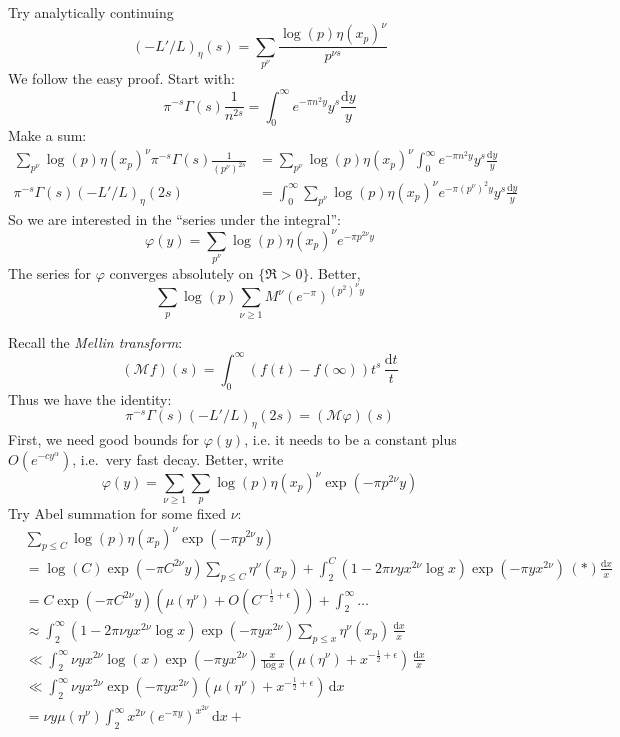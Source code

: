 \documentclass{article}
\newcommand{\cM}{\mathcal{M}}
\newcommand{\dd}{\mathrm{d}}
\theoremstyle{definition}
\begin{document}
Try analytically continuing 
\[
	(-L'/L)_\eta(s) = \sum_{p^\nu} \frac{\log(p)\eta(x_p)^\nu}{p^{\nu s}}
\]
We follow the easy proof. Start with:
\[
	\pi^{-s} \Gamma(s) \frac{1}{n^{2s}} = \int_0^\infty e^{-\pi n^2 y} y^s \frac{\dd y}{y}
\]
Make a sum:
\begin{align*}
	\sum_{p^\nu} \log(p) \eta(x_p)^\nu \pi^{-s} \Gamma(s) \frac{1}{(p^\nu)^{2s}}
		&= \sum_{p^\nu} \log(p) \eta(x_p)^\nu \int_0^\infty e^{-\pi n^2 y} y^s \frac{\dd y}{y} \\
	\pi^{-s} \Gamma(s) (-L'/L)_\eta(2s) 
		&=\int_0^\infty \sum_{p^\nu} \log(p) \eta(x_p)^\nu e^{-\pi (p^\nu)^2 y} y^s \frac{\dd y}{y}
\end{align*}
So we are interested in the ``series under the integral'':
\[
	\varphi(y) = \sum_{p^\nu} \log(p) \eta(x_p)^\nu e^{-\pi p^{2\nu} y} 
\]
The series for $\varphi$ converges absolutely on $\{\Re>0\}$. Better, 
\[
	\sum_p\log(p)\sum_{\nu\geqslant 1}  M^\nu (e^{-\pi})^{(p^2)^\nu y}
\]

Recall the \emph{Mellin transform}:
\[
	(\cM f)(s) = \int_0^\infty (f(t)-f(\infty))t^s\, \frac{\dd t}{t}
\]
Thus we have the identity:
\[
	\pi^{-s} \Gamma(s) (-L'/L)_\eta(2s) = (\cM \varphi)(s)
\]
First, we need good bounds for $\varphi(y)$, i.e. it needs to be a constant 
plus $O(e^{-c y^\alpha})$, i.e.~very fast decay. Better, write 
\[
	\varphi(y) = \sum_{\nu\geqslant 1}\sum_p  \log(p) \eta(x_p)^\nu \exp(-\pi p^{2\nu}y)
\]
Try Abel summation for some fixed $\nu$:
\begin{align*}
	& \sum_{p\leqslant C}\log(p) \eta(x_p)^\nu \exp(-\pi p^{2\nu}y) \\
		&= \log(C)\exp(-\pi C^{2\nu} y) \sum_{p\leqslant C} \eta^\nu(x_p) + \int_2^C (1-2\pi \nu y x^{2\nu}\log x) \exp(-\pi y x^{2\nu})\,(*) \frac{\dd x}{x} \\
		&= C \exp(-\pi C^{2\nu} y) (\mu(\eta^\nu)+O(C^{-\frac 1 2+\epsilon})) + \int_2^\infty \ldots \\
		&\approx \int_2^\infty (1-2\pi \nu y x^{2\nu}\log x) \exp(-\pi y x^{2\nu})\sum_{p\leqslant x} \eta^\nu(x_p)\, \frac{\dd x}{x} \\
		&\ll \int_2^\infty \nu y x^{2\nu}\log(x) \exp(-\pi y x^{2\nu}) \frac{x}{\log x}(\mu(\eta^\nu) + x^{-\frac 1 2+\epsilon})\, \frac{\dd x}{x} \\
		&\ll \int_2^\infty \nu y x^{2\nu} \exp(-\pi y x^{2\nu})(\mu(\eta^\nu)+x^{-\frac 1 2+\epsilon})\, \dd x \\
		&= \nu y \mu(\eta^\nu) \int_2^\infty x^{2\nu} (e^{-\pi y})^{ x^{2\nu}}\, \dd x + 
\end{align*}





\printbibliography
\end{document}
